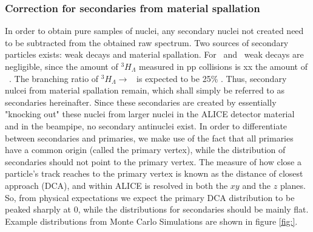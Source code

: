 

\subsubsection{Correction for secondaries from material spallation}
In order to obtain pure samples of nuclei, any secondary nuclei not created need to be subtracted from the obtained raw spectrum. Two sources of secondary particles exists: weak decays and material spallation. For \ahe\ and \atrit\, weak decays are negligible, since the amount of $^3H_\Lambda$ measured in pp collisions is xx the amount of \ahe\ \cite{}. The branching ratio of $^3H_\Lambda \rightarrow $ \ahe\ is expected to be 25\% \cite{PDG}. Thus, secondary nulcei from material spallation remain, which shall simply be referred to as secondaries hereinafter. Since these secondaries are created by essentially "knocking out" these nuclei from larger nuclei in the ALICE detector material and in the beampipe, no secondary antinuclei exist. In order to differentiate between secondaries and primaries, we make use of the fact that all primaries have a common origin (called the primary vertex), while the distribution of secondaries should not point to the primary vertex. The measure of how close a particle's track reaches to the primary vertex is known as the distance of closest approach (DCA), and within ALICE is resolved in both the $xy$ and the $z$ planes. So, from physical expectations we expect the primary DCA distribution to be peaked sharply at 0, while the distributions for secondaries should be mainly flat. Example distributions from Monte Carlo Simulations are shown in figure \ref{fig:}.


